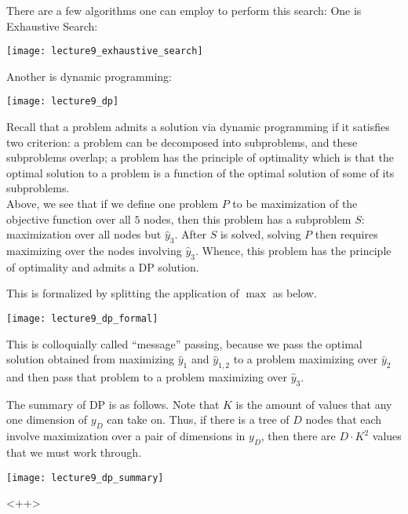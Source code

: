\documentclass[../main.tex]{subfiles}
\begin{document}
\begin{remark}
    There are a few algorithms one can employ to perform this search: One is Exhaustive Search:

    \begin{center}
        \texttt{[image: lecture9\_exhaustive\_search]}
    \end{center}

    Another is dynamic programming:

    \begin{center}
        \texttt{[image: lecture9\_dp]}
    \end{center}

    Recall that a problem admits a solution via dynamic programming if it satisfies
    two criterion: a problem can be decomposed into subproblems, and these subproblems
    overlap; a problem has the principle of optimality which is that the optimal
    solution to a problem is a function of the optimal solution of some of its subproblems. \\

    Above, we see that if we define one problem $P$ to be maximization of the objective
    function over all $5$ nodes, then this problem has a subproblem $S$: maximization
    over all nodes but $\hat{y}_3$. After $S$ is solved, solving
    $P$ then requires maximizing over the nodes involving $\hat{y}_3$. Whence,
    this problem has the principle of optimality and admits a DP solution.

    This is formalized by splitting the application of $\max$ as below.

    \begin{center}
        \texttt{[image: lecture9\_dp\_formal]}
    \end{center}

    This is colloquially called ``message'' passing, because we pass the optimal solution
    obtained from maximizing $\hat{y}_1$ and $\hat{y}_{1,2}$ to a problem maximizing
    over $\hat{y}_2$ and then pass that problem to a problem maximizing over $\hat{y}_3$.

    The summary of DP is as follows. Note that $K$ is the amount of values that
    any one dimension of $y_D$ can take on. Thus, if there is a tree of $D$ nodes
    that each involve maximization over a pair of dimensions in $y_D$, then there
    are $D \cdot K^2$ values that we must work through.
    \begin{center}
        \texttt{[image: lecture9\_dp\_summary]}
    \end{center}
\end{remark}<++>
\end{document}
